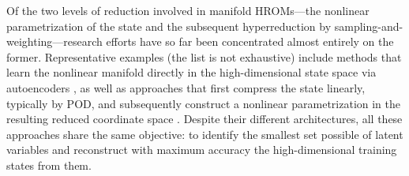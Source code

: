 \documentclass[preprint,10pt]{elsarticle}  %
\begin{document}
 Of the two levels of reduction involved in manifold HROMs---the
nonlinear parametrization of the state and the subsequent
hyperreduction by sampling-and-weighting---research efforts have so far
been concentrated almost entirely on the former. Representative examples (the list is not exhaustive) include
methods that learn the nonlinear manifold directly in the
high-dimensional state space via   autoencoders
\cite{lee2019model,fresca2021comprehensive}, as well as approaches that
first compress the state linearly, typically by POD, and subsequently
construct a nonlinear parametrization in the resulting reduced
coordinate space
\cite{fresca2022pod,barnett2022quadratic,barnett2023neural,
 ares2026nonlinear,koike2026sparse}. Despite their different architectures, all these approaches share the same objective: to identify the smallest set possible  of latent variables and reconstruct with maximum accuracy the high-dimensional training states from them.
%
\end{document}
